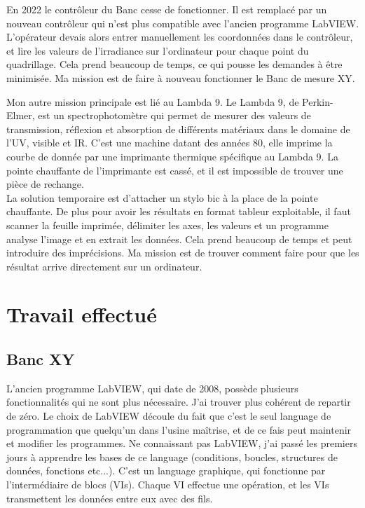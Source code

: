\documentclass[12pt]{article}
\begin{document}
En 2022 le contrôleur du Banc cesse de fonctionner.
Il est remplacé par un nouveau contrôleur qui n'est plus compatible avec l'ancien programme LabVIEW.\\
L'opérateur devais alors entrer manuellement les coordonnées dans le contrôleur, et lire les valeurs de l'irradiance sur l'ordinateur pour chaque point du quadrillage.
Cela prend beaucoup de temps, ce qui pousse les demandes à être minimisée.
Ma mission est de faire à nouveau fonctionner le Banc de mesure XY.


Mon autre mission principale est lié au Lambda 9.
Le Lambda 9, de Perkin-Elmer, est un spectrophotomètre qui permet de mesurer des valeurs de transmission, réflexion et absorption de différents matériaux dans le domaine de l'UV, visible et IR.
C'est une machine datant des années 80, elle imprime la courbe de donnée par une imprimante thermique spécifique au Lambda 9.
La pointe chauffante de l'imprimante est cassé, et il est impossible de trouver une pièce de rechange.\\
La solution temporaire est d'attacher un stylo bic à la place de la pointe chauffante.
De plus pour avoir les résultats en format tableur exploitable, il faut scanner la feuille imprimée, délimiter les axes, les valeurs et un programme analyse l'image et en extrait les données.
Cela prend beaucoup de temps et peut introduire des imprécisions.
Ma mission est de trouver comment faire pour que les résultat arrive directement sur un ordinateur.
\newpage

\section{Travail effectué}

\subsection{Banc XY}

L'ancien programme LabVIEW, qui date de 2008, possède plusieurs fonctionnalités qui ne sont plus nécessaire.
J'ai trouver plus cohérent de repartir de zéro.
Le choix de LabVIEW découle du fait que c'est le seul language de programmation que quelqu'un dans l'usine maîtrise, et de ce fais peut maintenir et modifier les programmes.
Ne connaissant pas LabVIEW, j'ai passé les premiers jours à apprendre les bases de ce language (conditions, boucles, structures de données, fonctions etc...).
C'est un language graphique, qui fonctionne par l'intermédiaire de blocs (VIs). Chaque VI effectue une opération, et les VIs transmettent les données entre eux avec des fils.
\end{document}
